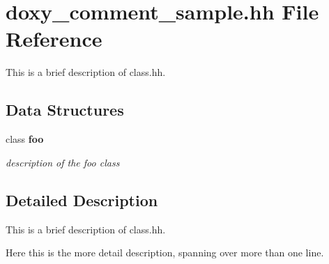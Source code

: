 \section{doxy\_\-comment\_\-sample.hh File Reference}
\label{doxy__comment__sample_8hh}
This is a brief description of class.hh. 

\subsection*{Data Structures}
\begin{CompactItemize}
\item 
class {\bf foo}
\begin{CompactList}\small\item\em description of the foo class \item\end{CompactList}\end{CompactItemize}


\subsection{Detailed Description}
This is a brief description of class.hh. 

Here this is the more detail description, spanning over more than one line. 